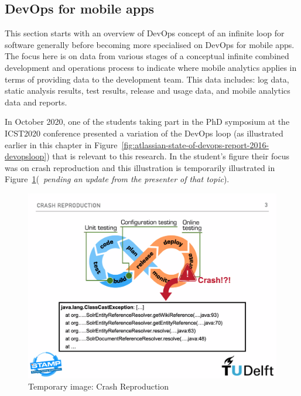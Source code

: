 \subsection{DevOps for mobile apps}
This section starts with an overview of DevOps concept of an infinite loop for software generally before becoming more specialised on DevOps for mobile apps. %
The focus here is on data from various stages of a conceptual infinite combined development and operations process to indicate where mobile analytics applies in terms of providing data to the development team. This data includes: log data, static analysis results, test results, release and usage data, and mobile analytics data and reports.

In October 2020, one of the students taking part in the PhD symposium at the ICST2020 conference presented a variation of the DevOps loop (as illustrated earlier in this chapter in Figure~\ref{fig:atlassian-state-of-devops-report-2016-devopsloop}) that is relevant to this research. In the student's figure their focus was on crash reproduction and this illustration is temporarily illustrated in Figure~\ref{fig:crash-reproduction-icst2020}(~\emph{pending an update from the presenter of that topic}).

\begin{figure}
    \includegraphics[width=\linewidth]{images/icst-2020/crash-reproduction-icst2020.pdf}
    \caption{Temporary image: Crash Reproduction}
    \label{fig:crash-reproduction-icst2020}
\end{figure}

